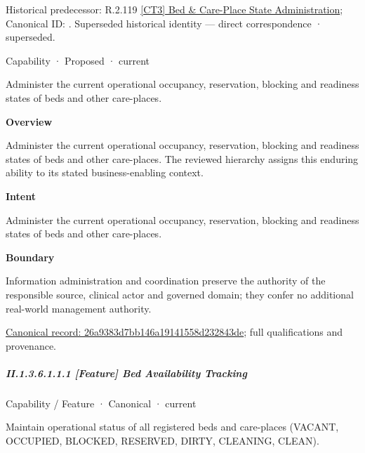 {\small Historical predecessor: R.2.119 \hyperref[element:dd2e2ee1a68845c087ba93610752181b]{[CT3] Bed \& Care-Place State Administration}; Canonical ID: \texttt{}. Superseded historical identity — direct correspondence · superseded.}\par
\label{element:26a9383d7bb146a19141558d232843de}
{\small Capability · Proposed · current}\par

Administer the current operational occupancy, reservation, blocking and readiness states of beds and other care-places.



\textbf{Overview}



Administer the current operational occupancy, reservation, blocking and readiness states of beds and other care-places. The reviewed hierarchy assigns this enduring ability to its stated business-enabling context.



\textbf{Intent}



Administer the current operational occupancy, reservation, blocking and readiness states of beds and other care-places.



\textbf{Boundary}



Information administration and coordination preserve the authority of the responsible source, clinical actor and governed domain; they confer no additional real-world management authority.


{\footnotesize \href{../../../../continuum/strategy/capability/26a9383d7bb146a19141558d232843de.md}{Canonical record: 26a9383d7bb146a19141558d232843de}; full qualifications and provenance.}\par
\subparagraph*{II.1.3.6.1.1.1 [Feature] Bed Availability Tracking}
\label{navigation:II.1.3.6.1.1.1}

\label{element:7c61f21e558c44ab92c267a781116d1d}
{\small Capability / Feature · Canonical · current}\par

Maintain operational status of all registered beds and care-places (VACANT, OCCUPIED, BLOCKED, RESERVED, DIRTY, CLEANING, CLEAN).



